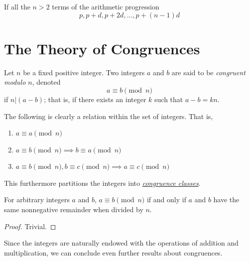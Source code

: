 \documentclass{article}
\newcounter{theorem}[section]
\newcounter{definition}[section]
\begin{document}
\begin{theorem}
  \label{thm:common-difference-of-a-prime-arithmetic}
If all the $n>2$ terms of the arithmetic progression 
\begin{equation}
  p, p+d, p+2d, ..., p + (n-1) d
\end{equation}
\end{theorem}

\section{The Theory of Congruences}

\begin{definition}
  \label{def:congruence-modulo-n}
Let $n$ be a fixed positive integer. Two integers $a$ and $b$ are said to be \textit{congruent modulo $n$}, denoted
\begin{equation}
  a \equiv b \pmod{n}
\end{equation}
if $n|(a-b)$; that is, if there exists an integer $k$ such that $a-b = k n$. 
\end{definition}

The following is clearly a relation within the set of integers. That is, 
\begin{enumerate}
    \item $a \equiv a \pmod{n}$
    \item $a \equiv b \pmod{n} \implies b \equiv a \pmod{n}$
    \item $a \equiv b \pmod{n}, b \equiv c \pmod{n} \implies a \equiv c \pmod{n}$
\end{enumerate} 
This furthermore partitions the integers into \textit{\hyperref[dg-def:congruence-classes]{congruence classes}}. 

\begin{theorem}
  \label{thm:congruence-via-equal-remainders}
For arbitrary integers $a$ and $b$, $a \equiv b \pmod{n}$ if and only if $a$ and $b$ have the same nonnegative remainder when divided by $n$. 
\end{theorem}
\begin{proof}
Trivial.
\end{proof}

Since the integers are naturally endowed with the operations of addition and multiplication, we can conclude even further results about congruences. 
\end{document}
